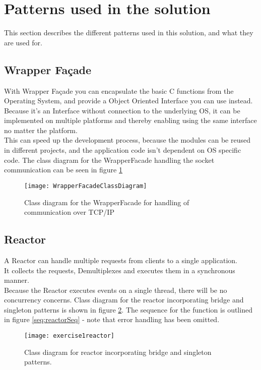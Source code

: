 \documentclass[Main]{subfiles}
\begin{document}
\section{Patterns used in the solution}\label{sec:patterns}
This section describes the different patterns used in this solution, and what they are used for.
\subsection{Wrapper Façade}
With Wrapper Façade you can encapsulate the basic C functions from the Operating System, and provide a Object Oriented Interface you can use instead.\\
Because it's an Interface without connection to the underlying OS, it can be implemented on multiple platforms and thereby enabling using the same interface no matter the platform.\\
This can speed up the development process, because the modules can be reused in different projects, and the application code isn't dependent on OS specific code. The class diagram for the WrapperFacade handling the socket communication can be seen in figure \ref{fig:wrapperfacadeuml}

\begin{figure}[hbtp]
\centering
\texttt{[image: WrapperFacadeClassDiagram]}
\caption{Class diagram for the WrapperFacade for handling of communication over TCP/IP}
\label{fig:wrapperfacadeuml}
\end{figure}


\subsection{Reactor}
A Reactor can handle multiple requests from clients to a single application.\\
It collects the requests, Demultiplexes and executes them in a synchronous manner.\\
Because the Reactor executes events on a single thread, there will be no concurrency concerns. Class diagram for the reactor incorporating bridge and singleton patterns is shown in figure \ref{fig:reactoruml}. The sequence for the  function is outlined in figure \ref{seq:reactorSeq} - note that error handling has been omitted.

\begin{figure}[hbtp]
\centering
\texttt{[image: exercise1reactor]}
\caption{Class diagram for reactor incorporating bridge and singleton patterns.}
\label{fig:reactoruml}
\end{figure}
\end{document}
